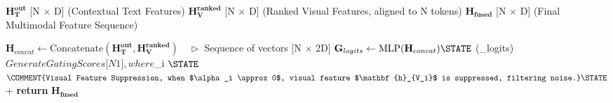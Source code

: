 \documentclass[12pt]{article}
\begin{document}
\begin{algorithm}
\caption{Smart Modality Gating Fusion}
\label{alg:module3}
\begin{algorithmic}[1]
\REQUIRE $\mathbf{H_{T}^{out}}$ [N $\times$ D] (Contextual Text Features)
\REQUIRE $\mathbf{H_{V}^{ranked}}$ [N $\times$ D] (Ranked Visual Features, aligned to N tokens)
\ENSURE $\mathbf{H_{fused}}$ [N $\times$ D] (Final Multimodal Feature Sequence)

\vspace{0.5cm}
\STATE $\mathbf{H}_{concat} \leftarrow \text{Concatenate}(\mathbf{H_{T}^{out}}, \mathbf{H_{V}^{ranked}}) \quad \triangleright$ Sequence of vectors [N $\times$ 2D]
\STATE $\mathbf{G}_{logits} \leftarrow \text{MLP}(\mathbf{H}_{concat}) 
\STATE $\mathbf{\alpha} \leftarrow {}(_{logits}) \quad \triangleright$ Generate Gating Scores [N $\times$ 1], where $\alpha_i \in [0, 1]$

\STATE $ \leftarrow {} \otimes \mathbf{\alpha} \quad \triangleright$ \COMMENT{Visual Feature Suppression, when $\alpha_i \approx 0$, visual feature $\mathbf{h}_{V_i}$ is suppressed, filtering noise.}

\STATE $ \leftarrow {} + 
\STATE \textbf{return} $\mathbf{H_{fused}}$
\end{algorithmic}
\end{algorithm}
\end{document}
